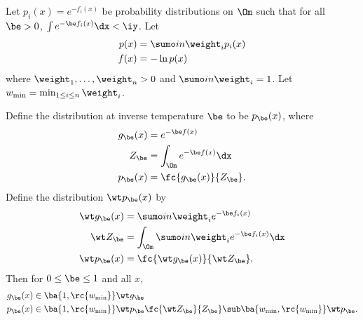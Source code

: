 \begin{lem}\label{lem:close-to-sum}
Let $p_i (x)= e^{-f_i(x)}$ be probability distributions on $\Om$ such that for all $\be>0$, $\int e^{-\be f_i(x)}\dx<\iy$. Let 
\begin{align}
p(x) & = \sumo in \weight_i p_i(x)\\
f(x) &= -\ln p(x)
\end{align}
where $\weight_1,\ldots, \weight_n>0$ and $\sumo in \weight_i=1$. Let $w_{\min}=\min_{1\le i\le n}\weight_i$.

Define the distribution at inverse temperature $\be$ to be $p_\be(x)$, where
\begin{align}
g_\be(x) &= e^{-\be f(x)}\\
Z_\be &= \int_{\Om} e^{-\be f(x)}\dx\\
p_\be(x) &= \fc{g_\be(x)}{Z_\be}.
\end{align}
Define the distribution $\wt p_\be(x)$ by
\begin{align}
\wt g_\be(x) &= \sumo in \weight_i e^{-\be f_i(x)}\\
\wt Z_\be &= \int_{\Om} \sumo in {\weight_i e^{-\be f_i(x)}}\dx\\
\wt p_\be(x) &= \fc{\wt g_\be(x)}{\wt Z_\be}.
\end{align}
Then for $0\le \be\le 1$ and all $x$,
\begin{align}
\label{eq:scale-temp1}
g_\be(x) &\in \ba{1,\rc{w_{\min}}} \wt g_\be\\
\label{eq:scale-temp2}
p_\be(x)& \in \ba{1, \rc{w_{\min}}}\wt p_\be \fc{\wt Z_\be}{Z_\be}\sub \ba{w_{\min}, \rc{w_{\min}}}\wt p_\be.
\end{align}
%
%
\end{lem}
